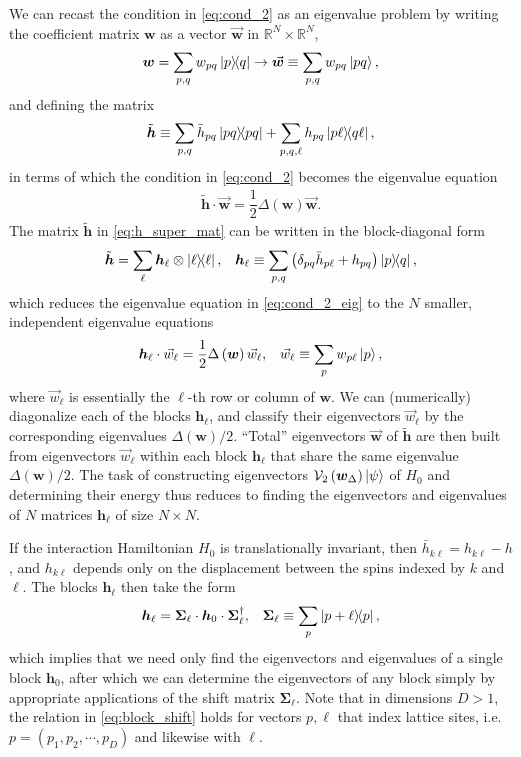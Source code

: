 \documentclass[nofootinbib,notitlepage,11pt]{revtex4-2}
\newcommand{\f}[2]{\dfrac{#1}{#2}} %
\newcommand{\p}[1]{\left(#1\right)} %
\renewcommand{\c}{\cdot} %
\newcommand{\m}{\bm} %
\renewcommand{\v}{\vec} %
\newcommand{\1}{\mathds{1}}
\newcommand{\V}{\mathcal{V}}
\newcommand{\RR}{\mathbb{R}}
\begin{document}
We can recast the condition in \eqref{eq:cond_2} as an eigenvalue
problem by writing the coefficient matrix $\m w$ as a vector
$\v{\m w}$ in $\RR^N\times\RR^N$,
\begin{align}
  \m w = \sum_{p,q} w_{pq} \op{p}{q}
  \to \v{\m w} \equiv \sum_{p,q} w_{pq} \ket{pq},
\end{align}
and defining the matrix
\begin{align}
  \tilde{\m h}
  \equiv \sum_{p,q} \bar h_{pq} \op{pq}
  + \sum_{p,q,\ell} h_{pq} \op{p\ell}{q\ell},
  \label{eq:h_super_mat}
\end{align}
in terms of which the condition in \eqref{eq:cond_2} becomes the
eigenvalue equation
\begin{align}
  \tilde{\m h} \c \v{\m w} = \f12 \Delta\p{\m w} \v{\m w}.
  \label{eq:cond_2_eig}
\end{align}
The matrix $\tilde{\m h}$ in \eqref{eq:h_super_mat} can be written in
the block-diagonal form
\begin{align}
  \tilde{\m h} = \sum_\ell \m h_\ell \otimes \op{\ell},
  &&
  \m h_\ell
  \equiv \sum_{p,q}\p{\delta_{pq} \bar h_{p\ell} + h_{pq}} \op{p}{q},
\end{align}
which reduces the eigenvalue equation in \eqref{eq:cond_2_eig} to the
$N$ smaller, independent eigenvalue equations
\begin{align}
  \m h_\ell \c \v w_\ell = \f12 \Delta\p{\m w} \v w_\ell,
  &&
  \v w_\ell \equiv \sum_p w_{p\ell} \ket{p},
  \label{eq:cond_2_eig_block}
\end{align}
where $\v w_\ell$ is essentially the $\ell$-th row or column of
$\m w$.  We can (numerically) diagonalize each of the blocks
$\m h_\ell$, and classify their eigenvectors $\v w_\ell$ by the
corresponding eigenvalues $\Delta\p{\m w}/2$.  ``Total'' eigenvectors
$\v{\m w}$ of $\tilde{\m h}$ are then built from eigenvectors
$\v w_\ell$ within each block $\m h_\ell$ that share the same
eigenvalue $\Delta\p{\m w}/2$.  The task of constructing eigenvectors
$\V_2\p{\m w_\Delta}\ket\psi$ of $H_0$ and determining their energy
thus reduces to finding the eigenvectors and eigenvalues of $N$
matrices $\m h_\ell$ of size $N\times N$.

If the interaction Hamiltonian $H_0$ is translationally invariant,
then $\bar h_{k\ell}=h_{k\ell}-h$, and $h_{k\ell}$ depends only on the
displacement between the spins indexed by $k$ and $\ell$.  The blocks
$\m h_\ell$ then take the form
\begin{align}
  \m h_{\ell} = \m\Sigma_\ell \c \m h_0 \c \m\Sigma_\ell^\dag,
  &&
  \m\Sigma_\ell \equiv \sum_p \op{p+\ell}{p},
  \label{eq:block_shift}
\end{align}
which implies that we need only find the eigenvectors and eigenvalues
of a single block $\m h_0$, after which we can determine the
eigenvectors of any block simply by appropriate applications of the
shift matrix $\m\Sigma_\ell$.  Note that in dimensions $D>1$, the
relation in \eqref{eq:block_shift} holds for vectors $p,\ell$ that
index lattice sites, i.e.~$p=\p{p_1,p_2,\cdots,p_D}$ and likewise with
$\ell$.
\end{document}

